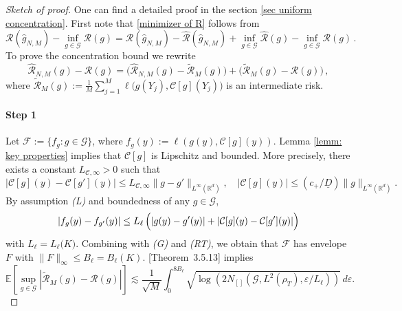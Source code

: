 \documentclass[11pt]{article}
\theoremstyle{remark}
\numberwithin{equation}{section}
\newcommand{\E}{\mathbb{E}}
\def\cmax{c_{+}}
\begin{document}
\begin{proof}[Sketch of proof] One can find a detailed proof in the section \ref{sec uniform concentration}. First note that \eqref{minimizer of R} follows from
$$
\mathcal{R}(\widehat{g}_{N,M}) - \inf_{g \in \mathcal G} \mathcal{R}(g) = \mathcal{R}(\widehat{g}_{N,M}) - \widehat{\mathcal{R}}(\widehat{g}_{N,M}) + \inf_{g \in \mathcal G}\widehat{\mathcal{R}}(g)  - \inf_{g \in \mathcal G} \mathcal{R}(g)\, .
$$
To prove the concentration bound we rewrite
\[
  \widehat{\mathcal{R}}_{N,M}(g) - \mathcal{R}(g)
  = \bigl(\widehat{\mathcal{R}}_{N,M}(g) - \widetilde{\mathcal{R}}_M(g)\bigr)+ \bigl(\widetilde{\mathcal{R}}_M(g) - \mathcal{R}(g)\bigr)\, ,
\]
where $\widetilde{\mathcal{R}}_M(g)
  :=
  \frac{1}{M}\sum_{j=1}^M
  \ell\bigl(g(Y_j),\mathcal{C}[g](Y_j)\bigr)$ is an intermediate risk. 
\paragraph{Step 1} Let $\mathcal{F}
  := \{ f_g : g\in\mathcal{G}\}$, where $f_g(y)
  :=
  \ell(g(y) ,\mathcal{C}[g](y))$. Lemma \ref{lemm: key properties} implies that $\mathcal{C}[g]$ is Lipschitz and bounded. More precisely, there exists a constant $L_{\mathcal C, \infty} > 0$ such that
\[
  |\mathcal{C}[g](y) - \mathcal{C}[g'](y)|
  \le
  L_{\mathcal C, \infty} \|g-g'\|_{L^\infty(\mathbb{R}^d)},\quad |\mathcal{C}[g](y)|\leq (\cmax/\underline{D})\|g\|_{L^\infty(\mathbb{R}^d)}.
\]
By  assumption \emph{(L)} and boundedness of any $g\in\mathcal{G}$,
\[
  |f_g(y) - f_{g'}(y)|
  \le
  L_\ell\,\Bigl(
    |g(y) - g'(y)| + |\mathcal{C}[g](y) - \mathcal{C}[g'](y)|
  \Bigr)
\]
with $L_\ell=L_\ell\bigl(K\bigr).$
Combining with \emph{(G)} and \emph{(RT)}, we obtain that $\mathcal{F}$ has 
envelope $F$ with  $\|F\|_{\infty}\leq B_\ell=B_\ell(K)$.
\cite{GineNickl2016}[Theorem~3.5.13] implies
\begin{equation*}
    \E[\sup_{g 
\in \mathcal G} |\widetilde{\mathcal{R}}_M(g) - \mathcal{R}(g)|]\lesssim  \frac{1}{\sqrt{M}}\int_{0}^{8  B_\ell} \sqrt{\log(2 N_{[]}(\mathcal{G}, L^{2}(\rho_T), \varepsilon/L_\ell))} \, d\varepsilon.
\end{equation*}   

\end{proof}
\end{document}
